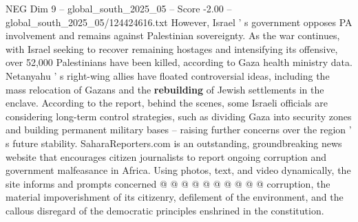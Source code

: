 \begin{textsample}{NEG Dim 9 – global\_south\_2025\_05 – Score -2.00 – global\_south\_2025\_05/124424616.txt}
However, Israel ' s government opposes PA involvement and remains against Palestinian sovereignty.
As the war continues, with Israel seeking to recover remaining hostages and intensifying its offensive, over 52,000 Palestinians have been killed, according to Gaza health ministry data.
Netanyahu ' s right-wing allies have floated controversial ideas, including the mass relocation of Gazans and the \textbf{rebuilding} of Jewish settlements in the enclave.
According to the report, behind the scenes, some Israeli officials are considering long-term control strategies, such as dividing Gaza into security zones and building permanent military bases -- raising further concerns over the region ' s future stability.
SaharaReporters.com is an outstanding, groundbreaking news website that encourages citizen journalists to report ongoing corruption and government malfeasance in Africa.
Using photos, text, and video dynamically, the site informs and prompts concerned @ @ @ @ @ @ @ @ @ @ corruption, the material impoverishment of its citizenry, defilement of the environment, and the callous disregard of the democratic principles enshrined in the constitution.

\end{textsample}
